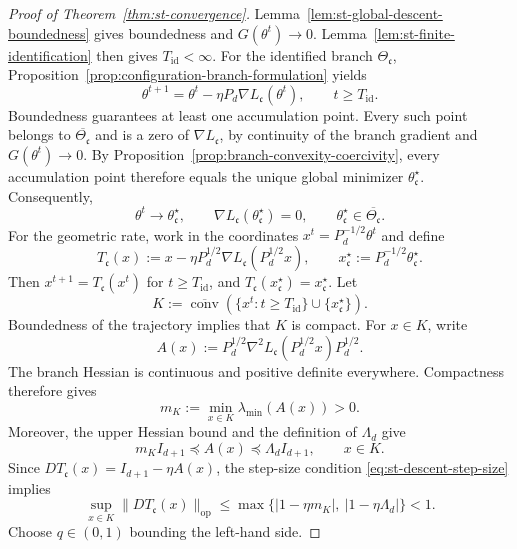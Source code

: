 \begin{proof}[Proof of Theorem~\ref{thm:st-convergence}]
Lemma~\ref{lem:st-global-descent-boundedness} gives boundedness and
$G(\theta^t)\to0$.
Lemma~\ref{lem:st-finite-identification} then gives
$T_{\mathrm{id}}<\infty$.
For the identified branch $\Theta_{\mathfrak c}$,
Proposition~\ref{prop:configuration-branch-formulation} yields
\[
    \theta^{t+1}
    =
    \theta^t-\eta P_d\nabla L_{\mathfrak c}(\theta^t),
    \qquad t\geq T_{\mathrm{id}}.
\]
Boundedness guarantees at least one accumulation point.
Every such point belongs to $\overline{\Theta_{\mathfrak c}}$
and is a zero of $\nabla L_{\mathfrak c}$, by continuity of the
branch gradient and $G(\theta^t)\to0$.
By Proposition~\ref{prop:branch-convexity-coercivity},
every accumulation point therefore equals the unique global
minimizer $\theta_{\mathfrak c}^\star$.
Consequently,
\begin{equation}
    \theta^t\longrightarrow\theta_{\mathfrak c}^\star,
    \qquad
    \nabla L_{\mathfrak c}(\theta_{\mathfrak c}^\star)=0,
    \qquad
    \theta_{\mathfrak c}^\star
        \in\overline{\Theta_{\mathfrak c}}.
    \label{eq:st-branch-limit}
\end{equation}
For the geometric rate, work in the coordinates
$x^t=P_d^{-1/2}\theta^t$ and define
\[
    T_{\mathfrak c}(x)
    :=
    x-\eta P_d^{1/2}
        \nabla L_{\mathfrak c}(P_d^{1/2}x),
    \qquad
    x_{\mathfrak c}^\star
    :=
    P_d^{-1/2}\theta_{\mathfrak c}^\star.
\]
Then $x^{t+1}=T_{\mathfrak c}(x^t)$ for
$t\geq T_{\mathrm{id}}$, and
$T_{\mathfrak c}(x_{\mathfrak c}^\star)
=x_{\mathfrak c}^\star$.
Let
\[
    K
    :=
    \overline{\operatorname{conv}}
    \left(
        \{x^t:t\geq T_{\mathrm{id}}\}
        \cup\{x_{\mathfrak c}^\star\}
    \right).
\]
Boundedness of the trajectory implies that $K$ is compact.
For $x\in K$, write
\[
    A(x)
    :=
    P_d^{1/2}
        \nabla^2L_{\mathfrak c}(P_d^{1/2}x)
    P_d^{1/2}.
\]
The branch Hessian is continuous and positive definite
everywhere. Compactness therefore gives
\[
    m_K
    :=
    \min_{x\in K}\lambda_{\min}(A(x))
    >0.
\]
Moreover, the upper Hessian bound and the definition of
$\Lambda_d$ give
\[
    m_K I_{d+1}
    \preceq A(x)
    \preceq \Lambda_d I_{d+1},
    \qquad x\in K.
\]
Since
\(
    DT_{\mathfrak c}(x)
    =
    I_{d+1}-\eta A(x)
\),
the step-size condition \eqref{eq:st-descent-step-size}
implies
\[
    \sup_{x\in K}
        \|DT_{\mathfrak c}(x)\|_{\mathrm{op}}
    \leq
    \max\{|1-\eta m_K|,\ |1-\eta\Lambda_d|\}
    <1.
\]
Choose $q\in(0,1)$ bounding the left-hand side.

\end{proof}
